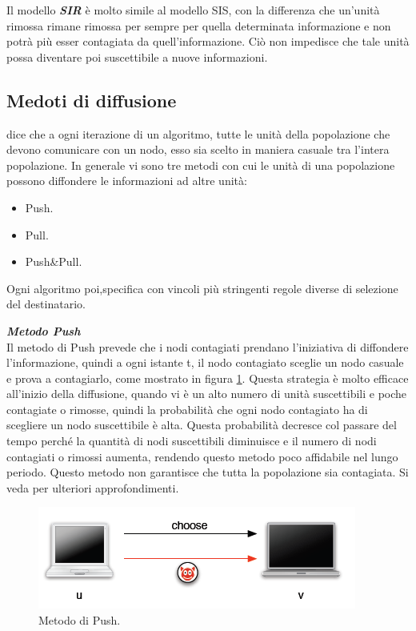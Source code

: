 Il modello \textbf{\textit{\acf{SIR}}} è molto simile al modello \acs{SIS}, con la differenza che un'unità rimossa rimane rimossa per sempre per quella determinata informazione e non potrà più esser contagiata da quell'informazione. Ciò non impedisce che tale unità possa diventare poi suscettibile a nuove informazioni.

\subsection{Medoti di diffusione}
\cite{schindel2004-epidemicAlg} dice che a ogni iterazione di un  algoritmo, tutte le unità della popolazione che devono comunicare con un nodo, esso sia scelto in maniera casuale tra l'intera popolazione. In generale vi sono tre metodi con cui le unità di una popolazione possono diffondere le informazioni ad altre unità:
\begin{itemize}
	\item Push.
	\item Pull.
	\item Push\&Pull.
\end{itemize}
Ogni algoritmo poi,specifica con vincoli più stringenti regole diverse di selezione del destinatario.
\bigskip

\noindent\textbf{\textit{Metodo Push}}\\
Il metodo di Push prevede che i nodi contagiati prendano l'iniziativa di diffondere l'informazione, quindi a ogni istante t, il nodo contagiato sceglie un nodo casuale e prova a contagiarlo, come mostrato in figura \ref{fig:push}. Questa strategia è molto efficace all'inizio della diffusione, quando vi è un alto numero di unità suscettibili e poche contagiate o rimosse, quindi la probabilità che ogni nodo contagiato ha di scegliere un nodo suscettibile è alta. Questa probabilità decresce col passare del tempo perché la quantità di nodi suscettibili diminuisce e il numero di nodi contagiati o rimossi aumenta, rendendo questo metodo poco affidabile nel lungo periodo. Questo metodo non garantisce che tutta la popolazione sia contagiata. Si veda \cite{schindel2004-epidemicAlg} per ulteriori approfondimenti.

\begin{figure}[bh]
	\centering
	\includegraphics[width=0.6\linewidth,keepaspectratio]{Images/algoritmi_gossip/push}
	\caption[Metodo di Push]{Metodo di Push.}
	\label{fig:push}
\end{figure}
\bigskip


